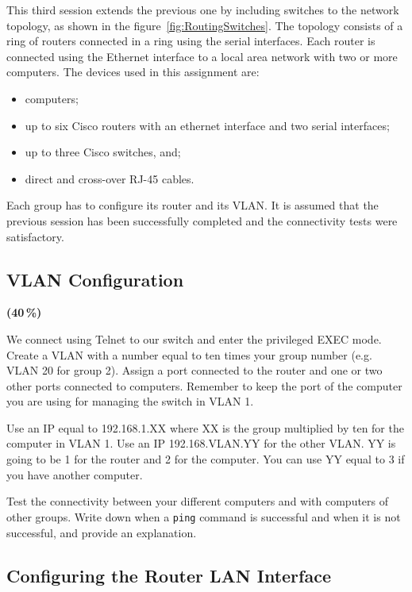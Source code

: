 This third session extends the previous one by including switches to the network topology, as shown in the figure~\ref{fig:RoutingSwitches}. The topology consists of a ring of routers connected in a ring using the serial interfaces. Each router is connected using the Ethernet interface to a local area network with two or more computers. The devices used in this assignment are:

\begin{itemize}
\item computers;
\item up to six Cisco routers with an ethernet interface and two serial interfaces;
\item up to three Cisco switches, and;
\item direct and cross-over RJ-45 cables.
\end{itemize}

Each group has to configure its router and its VLAN. It is assumed that the previous session has been successfully completed and the connectivity tests were satisfactory.

\subsection{VLAN Configuration}

{\color{red}\textbf{(40\,\%)}}

We connect using Telnet to our switch and enter the privileged EXEC mode. Create a VLAN with a number equal to ten times your group number (e.g. VLAN 20 for group 2). Assign a port connected to the router and one or two other ports connected to computers. Remember to keep the port of the computer you are using for managing the switch in VLAN 1.

Use an IP equal to 192.168.1.XX where XX is the group multiplied by ten for the computer in VLAN 1. Use an IP 192.168.VLAN.YY for the other VLAN. YY is going to be 1 for the router and 2 for the computer. You can use YY equal to 3 if you have another computer.

Test the connectivity between your different computers and with computers of other groups. Write down when a \texttt{\color{blue}ping} command is successful and when it is not successful, and provide an explanation.

\subsection{Configuring the Router LAN Interface}

